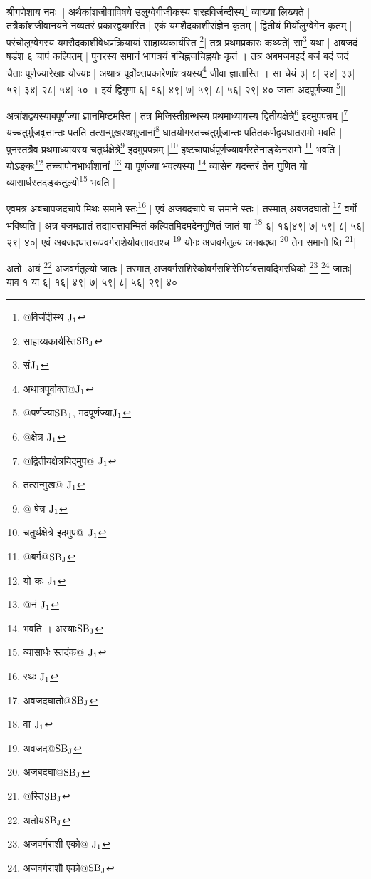 \documentclass[12pt]{article}
\begin{document}
{\s  
श्रीगणेशाय नमः || 
अथैकांशजीवाविषये
उलुग्वेगीजीकस्य
शरहविर्जन्दीस्य\footnote{{\s @विर्जंदीस्थ }${\rm J_1}$}
व्याख्या लिख्यते |
तत्रैकांशजी\-वान\-यने नव्यतरं प्रकारद्वयमस्ति |
एकं यमशैदकाशीसंज्ञेन कृतम् |
द्वितीयं मिर्योलुग्वेगेन कृतम् |
परंचोलुग्वेगस्य यमसैदकाशीवेधप्रक्रियायां
साहाय्यकार्यस्ति \footnote{{\s साहाय्यकार्यस्ति}${\rm SB_J}$}| 
तत्र प्रथमप्रकारः कथ्यते| सा\footnote{{\s सं}${\rm J_1}$} यथा |
अबजदं षडंश ६ चापं कल्पितम् |
पुनरस्य समानं भागत्रयं बचिह्नजचिह्नयोः कृतं । 
तत्र अबमजमहदं बजं बदं जदं चैताः पूर्णज्यारेखाः
योज्याः |
अथात्र पूर्वोक्तप्रकारेणांशत्रयस्य\footnote{{\s अथात्रपूर्वाक्त@}${\rm J_1}$}
जीवा ज्ञातास्ति । सा चेयं ३| ८| २४| ३३| ५९| ३४| २८| ५४| ५० ।
इयं द्विगुणा ६| १६| ४९| ७| ५९| ८| ५६| २९| ४० जाता अदपूर्णज्या \footnote{{\s @पर्णज्या}${\rm SB_J}$, {\s मदपूर्णज्या}${\rm J_1}$}||

अत्रांशद्वयस्याबपूर्णज्या ज्ञानमिष्टमस्ति |
तत्र मिजिस्तीग्रन्थस्य
प्रथमाध्यायस्य द्वितीयक्षेत्रे\footnote{{\s @क्षेत्र }${\rm J_1}$}
इदमुपपन्नम् |\footnote{{\s @द्वितीयक्षेत्रयिदमुप@ }${\rm J_1}$}
यच्चतुर्भुजवृत्तान्तः पतति
तत्सन्मुखस्थभुजानां\footnote{{\s तत्संन्मुख@ } ${\rm J_1}$}
घातयोगस्तच्चतुर्भुजान्तः पतितकर्णद्वयघातसमो भवति |
पुनस्तत्रैव प्रथमाध्यायस्य
चतुर्थक्षेत्रे\footnote{{\s @
षेत्र }${\rm J_1}$} इदमुपपन्नम् |\footnote{{\s चतुर्थक्षेत्रे इदमुप@ }${\rm J_1}$}
इष्टचापार्धपूर्णज्यावर्गस्तेनाङ्केनसमो \footnote{{\s @बर्ग@}${\rm SB_J}$} भवति |
योऽङ्कः\footnote{{\s यो कः }${\rm J_1}$} %
 तच्चापोनभार्धांशानां \footnote{{\s @नं }${\rm J_1}$} या पूर्णज्या भवत्यस्या \footnote{{\s भवति । अस्याः}${\rm SB_J}$}
व्यासेन यदन्तरं तेन गुणित यो
व्यासार्धस्तदङ्कतुल्यो\footnote{{\s व्यासार्धः स्तदंक@ }${\rm J_1}$}
भवति |

एवमत्र अबचापजदचापे मिथः समाने स्तः\footnote{{\s स्थः }${\rm J_1}$} |
एवं अजबदचापे च समाने स्तः |
तस्मात् अबजदघातो \footnote{{\s अवजदघातो@}${\rm SB_J}$} वर्गो भविष्यति |
अत्र बजमज्ञातं तद्यावत्तावन्मितं कल्पितमिदमदेनगुणितं
जातं या \footnote{{\s वा }${\rm J_1}$} ६| १६|४९| ७| ५९| ८| ५६| २९| ४०|
एवं अबजदघातरूपवर्गराशेर्यावत्तावतश्च \footnote{{\s अवजद@}${\rm SB_J}$} योगः
अजवर्गतुल्य अनबदथा \footnote{{\s अजबदघा@}${\rm SB_J}$} तेन समानो ष्ति \footnote{{\s @स्ति}${\rm SB_J}$}|

अतो .अयं \footnote{{\s अतोयं}${\rm SB_J}$} अजवर्गतुल्यो जातः |
तस्मात्
अजवर्गराशिरेकोवर्गराशिरेभिर्यावत्तावद्भिरधिको
\footnote{{\s अजवर्गराशी एको@ }${\rm J_1}$}
\footnote{{\s अजवर्गराशौ एको@}${\rm SB_J}$}
जातः|
याव १ या ६| १६| ४९| ७| ५९| ८| ५६| २९| ४०

}
\end{document}
